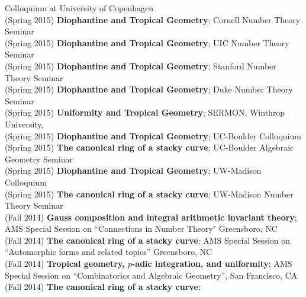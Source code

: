 \documentclass[margin,line]{res}
\begin{document}
\begin{resume}
Colloquium at University of Copenhagen
\vspace{.05cm}\\
(Spring 2015) \textbf{Diophantine and Tropical Geometry};
Cornell Number Theory Seminar
\vspace{.05cm}\\
(Spring 2015) \textbf{Diophantine and Tropical Geometry};
UIC Number Theory Seminar
\vspace{.05cm}\\
(Spring 2015) \textbf{Diophantine and Tropical Geometry};
Stanford Number Theory Seminar
\vspace{.05cm}\\
(Spring 2015) \textbf{Diophantine and Tropical Geometry};
Duke Number Theory Seminar
\vspace{.05cm}\\
(Spring 2015) \textbf{Uniformity and Tropical Geometry};
SERMON, Winthrop University, 
\vspace{.05cm}\\
(Spring 2015) \textbf{Diophantine and Tropical Geometry};
UC-Boulder Colloquium
\vspace{.05cm}\\
(Spring 2015) \textbf{The canonical ring of a stacky curve};  
UC-Boulder Algebraic Geometry Seminar
\vspace{.05cm}\\
(Spring 2015) \textbf{Diophantine and Tropical Geometry};
UW-Madison Colloquium
\vspace{.05cm}\\
(Spring 2015) \textbf{The canonical ring of a stacky curve};  
UW-Madison Number Theory Seminar
\vspace{.05cm}\\
(Fall 2014) \textbf{Gauss composition and integral arithmetic invariant theory};  
AMS Special Session on  ``Connections in Number Theory" Greensboro, NC
\vspace{.05cm}\\
(Fall 2014) \textbf{The canonical ring of a stacky curve};
AMS Special Session on ``Automorphic forms and related topics'' Greensboro, NC
\vspace{.05cm}\\
(Fall 2014) \textbf{Tropical geometry, $p$-adic integration, and uniformity};
AMS Special Session on ``Combinatorics and Algebraic Geometry'', San Francisco, CA
\vspace{.05cm}\\
(Fall 2014) \textbf{The canonical ring of a stacky curve};  

\end{resume}
\end{document}
